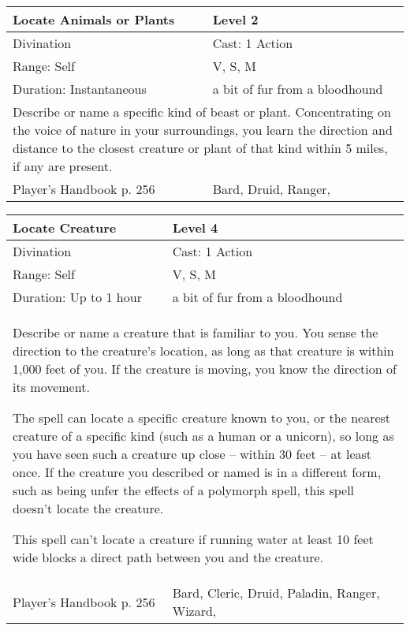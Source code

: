 \documentclass[11pt]{report}
\begin{document}
\begin{table}[H]
	\begin{tabular}{||p{6cm}|p{6cm}||}
		\hline\hline
		\bf{Locate Animals or Plants} & Level 2\\ \hline
		Divination & Cast: 1 Action\\ \hline
		Range: Self & V, S, M\\ \hline
		Duration: Instantaneous & a bit of fur from a bloodhound\\ \hline
		\multicolumn{2}{||p{12cm}||}{Describe or name a specific kind of beast or plant. Concentrating on the voice of nature in your surroundings, you learn the direction and distance to the closest creature or plant of that kind within 5 miles, if any are present.}\\ \hline
Player's Handbook p. 256 & Bard, Druid, Ranger, \\ \hline\hline
	\end{tabular}
\end{table}

\begin{table}[H]
	\begin{tabular}{||p{6cm}|p{6cm}||}
		\hline\hline
		\bf{Locate Creature} & Level 4\\ \hline
		Divination & Cast: 1 Action\\ \hline
		Range: Self & V, S, M\\ \hline
		Duration: Up to 1 hour & a bit of fur from a bloodhound\\ \hline
		\multicolumn{2}{||p{12cm}||}{Describe or name a creature that is familiar to you. You sense the direction to the creature’s location, as long as that creature is within 1,000 feet of you. If the creature is moving, you know the direction of its movement.

The spell can locate a specific creature known to you, or the nearest creature of a specific kind (such as a human or a unicorn), so long as you have seen such a creature up close – within 30 feet – at least once. If the creature you described or named is in a different form, such as being unfer the effects of a polymorph spell, this spell doesn’t locate the creature.

This spell can’t locate a creature if running water at least 10 feet wide blocks a direct path between you and the creature.}\\ \hline
Player's Handbook p. 256 & Bard, Cleric, Druid, Paladin, Ranger, Wizard, \\ \hline\hline
	\end{tabular}
\end{table}
\end{document}

